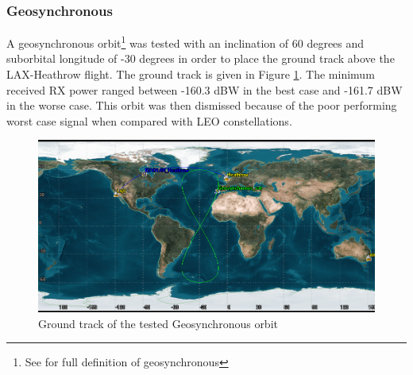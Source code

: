 \subsubsection{Geosynchronous}
A geosynchronous orbit\footnote{See \cite{wertz1999space} for full definition of geosynchronous} was tested with an inclination of 60 degrees and suborbital longitude of -30 degrees in order to place the ground track above the LAX-Heathrow flight. The ground track is given in Figure \ref{fig:geosynch}. The minimum received RX power ranged between -160.3 dBW in the best case and -161.7 dBW in the worse case. This orbit was then dismissed because of the poor performing worst case signal when compared with LEO constellations. 

\begin{figure}[H]
	\centering
	\includegraphics[scale = 0.55]{Pictures/geosynch.png}
	
	\caption{Ground track of the tested Geosynchronous orbit}
	\label{fig:geosynch}
\end{figure} 
